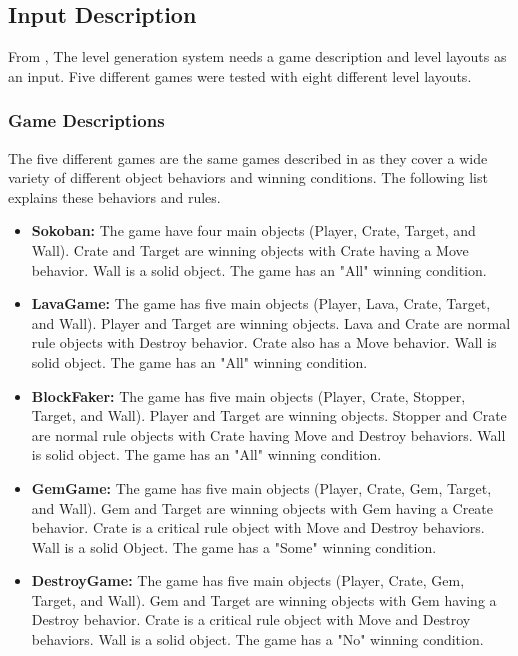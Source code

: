 \subsection{Input Description}
From , The level generation system needs a game description and level layouts as an input. Five different games were tested with eight different level layouts.

\subsubsection{Game Descriptions}
The five different games are the same games described in  as they cover a wide variety of different object behaviors and winning conditions. The following list explains these behaviors and rules.
\begin{itemize}
	\item \textbf{Sokoban:} The game have four main objects (Player, Crate, Target, and Wall). Crate and Target are winning objects with Crate having a Move behavior. Wall is a solid object. The game has an "All" winning condition.
	
	\item \textbf{LavaGame:} The game has five main objects (Player, Lava, Crate, Target, and Wall). Player and Target are winning objects. Lava and Crate are normal rule objects with Destroy behavior. Crate also has a Move behavior. Wall is solid object. The game has an "All" winning condition.
	
	\item \textbf{BlockFaker:} The game has five main objects (Player, Crate, Stopper, Target, and Wall). Player and Target are winning objects. Stopper and Crate are normal rule objects with Crate having Move and Destroy behaviors. Wall is solid object. The game has an "All" winning condition.
	
	\item \textbf{GemGame:} The game has five main objects (Player, Crate, Gem, Target, and Wall). Gem and Target are winning objects with Gem having a Create behavior. Crate is a critical rule object with Move and Destroy behaviors. Wall is a solid Object. The game has a "Some" winning condition.
	
	\item \textbf{DestroyGame:} The game has five main objects (Player, Crate, Gem, Target, and Wall). Gem and Target are winning objects with Gem having a Destroy behavior. Crate is a critical rule object with Move and Destroy behaviors. Wall is a solid object. The game has a "No" winning condition.
\end{itemize}

